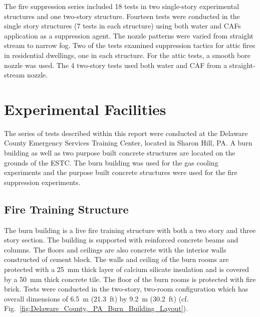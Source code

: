 \documentclass[12pt,oneside]{book}
\begin{document}
The fire suppression series included 18 tests in two single-story experimental structures and one two-story structure. Fourteen tests were conducted in the single story structures (7 tests in each structure) using both water and CAFs application as a suppression agent. The nozzle patterns were varied from straight stream to narrow fog. Two of the tests examined suppression tactics for attic fires in residential dwellings, one in each structure. For the attic tests, a smooth bore nozzle was used. The 4 two-story tests used both water and CAF from a straight-stream nozzle.

\section{Experimental Facilities}
\label{sec:Experimental_Facility}

The series of tests described within this report were conducted at the Delaware County Emergency Services Training Center, located in Sharon Hill, PA. A burn building as well as two purpose built concrete structures are located on the grounds of the ESTC. The burn building was used for the gas cooling experiments and the purpose built concrete structures were used for the fire suppression experiments.

\subsection{Fire Training Structure}
\label{sec:Burn_Building}

The burn building is a live fire training structure with both a two story and three story section. The building is supported with reinforced concrete beams and columns. The floors and ceilings are also concrete with the interior walls constructed of cement block. The walls and ceiling of the burn rooms are protected with a 25~mm thick layer of calcium silicate insulation and is covered by a 50~mm thick concrete tile. The floor of the burn rooms is protected with fire brick. Tests were conducted in the two-story, two-room configuration which has overall dimensions of 6.5~m (21.3~ft) by 9.2~m (30.2~ft) (cf. Fig.~\ref{fig:Delaware_County,_PA_Burn_Building_Layout}).
\end{document}
